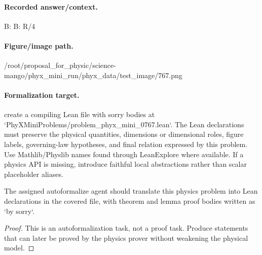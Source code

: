 \paragraph{Recorded answer/context.}
B: B: R/4

\paragraph{Figure/image path.}
/root/proposal\_for\_physic/science-mango/phyx\_mini\_run/phyx\_data/test\_image/767.png

\paragraph{Formalization target.}
create a compiling Lean file with sorry bodies at `PhyXMiniProblems/problem\_phyx\_mini\_0767.lean`. The Lean declarations must preserve the physical quantities, dimensions or dimensional roles, figure labels, governing-law hypotheses, and final relation expressed by this problem.
Use Mathlib/Physlib names found through LeanExplore where available. If a physics API is missing, introduce faithful local abstractions rather than scalar placeholder aliases.

\begin{theorem}
\label{thm:physics:phyx_mini_0767:target}
The assigned autoformalize agent should translate this physics problem into Lean declarations in the covered file, with theorem and lemma proof bodies written as `by sorry`.
\end{theorem}
\begin{proof}
This is an autoformalization task, not a proof task. Produce statements that can later be proved by the physics prover without weakening the physical model.
\end{proof}

